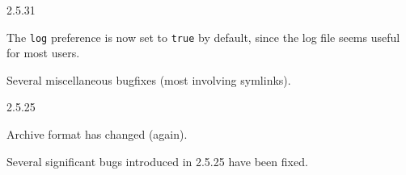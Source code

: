 \begin{changesfromversion}{2.5.31}
\item The \verb|log| preference is now set to \verb|true| by default,
  since the log file seems useful for most users.  
\item Several miscellaneous bugfixes (most involving symlinks).
\end{changesfromversion}

\begin{changesfromversion}{2.5.25}
\item \incompatible{} Archive format has changed (again).  

\item Several significant bugs introduced in 2.5.25 have been fixed.  
\end{changesfromversion}

